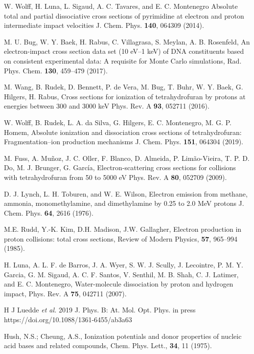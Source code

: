 \documentclass[10pt,showpacs,twocolumn]{revtex4}
\begin{document}
\begin{thebibliography}{}
W. Wolff, H. Luna, L. Sigaud, A. C. Tavares, and E. C. Montenegro
Absolute total and partial dissociative cross sections of pyrimidine
at electron and proton intermediate impact velocities
J. Chem. Phys. \textbf{140}, 064309 (2014).

M. U. Bug, W. Y. Baek, H. Rabus, C. Villagrasa, S. Meylan, A. B. Rosenfeld,
An electron-impact cross section data set (10 eV--1 keV) of DNA
constituents based on consistent experimental data: A requisite for 
Monte Carlo simulations,
Rad. Phys. Chem. \textbf{130}, 459--479 (2017).

M. Wang, B. Rudek, D. Bennett, P. de Vera, M. Bug, T. Buhr, W. Y. Baek, 
G. Hilgers, H. Rabus, 
Cross sections for ionization of tetrahydrofuran by protons at energies 
between 300 and 3000 keV
Phys. Rev. A \textbf{93}, 052711 (2016).

W. Wolff, B. Rudek, L. A. da Silva, G. Hilgers, E. C. Montenegro, 
M. G. P. Homem,
Absolute ionization and dissociation cross sections of tetrahydrofuran:
Fragmentation--ion production mechanisms
J. Chem. Phys. \textbf{151}, 064304 (2019).

M. Fuss, A. Muñoz, J. C. Oller, F. Blanco, D. Almeida, P. Limão-Vieira, 
T. P. D. Do, M. J. Brunger, G. Garc\'{i}a,
Electron-scattering cross sections for collisions with tetrahydrofuran 
from 50 to 5000 eV
Phys. Rev. A \textbf{80}, 052709 (2009).

D. J. Lynch, L. H. Toburen, and W. E. Wilson,
Electron emission from methane, ammonia, monomethylamine, and
dimethylamine by 0.25 to 2.0 MeV protons
J. Chem. Phys. \textbf{64}, 2616 (1976).

M.E. Rudd, Y.-K. Kim, D.H. Madison, J.W. Gallagher,
Electron production in proton collisions: total cross sections,
Review of Modern Physics, \textbf{57}, 965--994 (1985).

H. Luna, A. L. F. de Barros, J. A. Wyer, S. W. J. Scully, J. Lecointre, 
P. M. Y. Garcia, G. M. Sigaud, A. C. F. Santos, V. Senthil, M. B. Shah, 
C. J. Latimer, and E. C. Montenegro,
Water-molecule dissociation by proton and hydrogen impact,
Phys. Rev. A \textbf{75}, 042711 (2007).

H J Luedde {\it et al.} 2019 
J. Phys. B: At. Mol. Opt. Phys. in press 
https://doi.org/10.1088/1361-6455/ab3a63

Hush, N.S.; Cheung, A.S., 
Ionization potentials and donor properties of nucleic acid bases and 
related compounds, 
Chem. Phys. Lett., \textbf{34}, 11 (1975).


\end{thebibliography}
\end{document}

